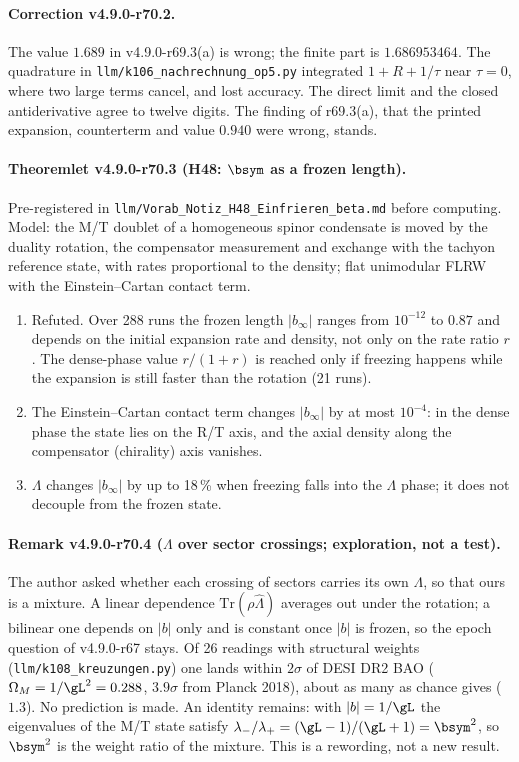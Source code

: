 \paragraph{Correction v4.9.0-r70.2.}
The value \(1.689\) in v4.9.0-r69.3(a) is wrong; the finite part is \(1.686953464\).  The quadrature in \texttt{llm/k106\_nachrechnung\_op5.py}
integrated \(1+R+1/\tau\) near \(\tau=0\), where two large terms cancel, and lost accuracy.  The direct limit and the closed antiderivative agree
to twelve digits.  The finding of r69.3(a), that the printed expansion, counterterm and value \(0.940\) were wrong, stands.

\paragraph{Theoremlet v4.9.0-r70.3 (H48: \(\bsym\) as a frozen length).}
Pre-registered in \texttt{llm/Vorab\_Notiz\_H48\_Einfrieren\_beta.md} before computing.  Model: the M/T doublet of a homogeneous spinor condensate
is moved by the duality rotation, the compensator measurement and exchange with the tachyon reference state, with rates proportional to the density;
flat unimodular FLRW with the Einstein--Cartan contact term.
\begin{enumerate}[leftmargin=2em]
\item[(a)] Refuted.  Over 288 runs the frozen length \(|b_\infty|\) ranges from \(10^{-12}\) to \(0.87\) and depends on the initial expansion rate and density,
not only on the rate ratio \(r\).  The dense-phase value \(r/(1+r)\) is reached only if freezing happens while the expansion is still faster than the
rotation (21 runs).
\item[(b)] The Einstein--Cartan contact term changes \(|b_\infty|\) by at most \(10^{-4}\): in the dense phase the state lies on the R/T axis, and the
axial density along the compensator (chirality) axis vanishes.
\item[(c)] \(\Lambda\) changes \(|b_\infty|\) by up to 18\,\% when freezing falls into the \(\Lambda\) phase; it does not decouple from the frozen state.
\end{enumerate}

\paragraph{Remark v4.9.0-r70.4 (\(\Lambda\) over sector crossings; exploration, not a test).}
The author asked whether each crossing of sectors carries its own \(\Lambda\), so that ours is a mixture.  A linear dependence \(\mathrm{Tr}(\rho\hat\Lambda)\)
averages out under the rotation; a bilinear one depends on \(|b|\) only and is constant once \(|b|\) is frozen, so the epoch question of v4.9.0-r67 stays.
Of 26 readings with structural weights (\texttt{llm/k108\_kreuzungen.py}) one lands within \(2\sigma\) of DESI DR2 BAO
(\(\Omega_M=1/\gL^2=0.288\), \(3.9\sigma\) from Planck 2018), about as many as chance gives (\(1.3\)).  No prediction is made.  An identity remains:
with \(|b|=1/\gL\) the eigenvalues of the M/T state satisfy \(\lambda_-/\lambda_+=(\gL-1)/(\gL+1)=\bsym^2\), so \(\bsym^2\) is the weight ratio of the
mixture.  This is a rewording, not a new result.

